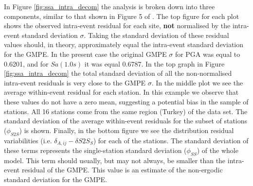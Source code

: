 In Figure \ref{fig:ssa_intra_decom} the analysis is broken down into three components, similar to that shown in Figure 5 of \citet{RodriguezMarek_etal2011}. The top figure for each plot shows the observed intra-event residual for each site, \textbf{not} normalised by the intra-event standard deviation $\sigma$. Taking the standard deviation of these residual values should, in theory, approximately equal the intra-event standard deviation for the GMPE. In the present case the original GMPE $\sigma$ for PGA was equal to 0.6201, and for $Sa \left( {1.0s} \right)$ it was equal 0.6787. In the top graph in Figure \ref{fig:ssa_intra_decom} the total standard deviation of all the non-normalised intra-event residuals is very close to the GMPE $\sigma$. In the middle plot we see the average within-event residual for each station. In this example we observe that these values do not have a zero mean, suggesting a potential bias in the sample of stations. All 16 stations come from the same region (Turkey) of the data set. The standard deviation of the average within-event residuals for the subset of stations ($\phi_{S2S}$) is shown. Finally, in the bottom figure we see the distribution residual variabilities (i.e. $\delta_{A,ij} - \delta S2S_S$) for each of the stations. The standard deviation of these terms represents the single-station standard deviation ($\phi_{SS}$) of the whole model. This term should usually, but may not always, be smaller than the intra-event residual of the GMPE. This value is an estimate of the non-ergodic standard deviation for the GMPE. 



